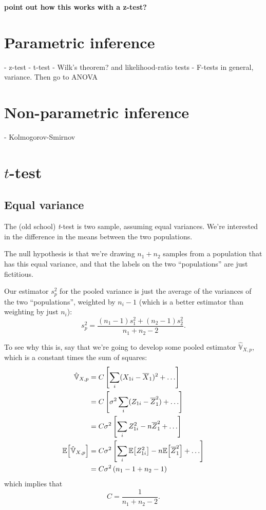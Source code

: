\textbf{point out how this works with a z-test?}

\section{Parametric inference}

- z-test
- t-test
- Wilk's theorem? and likelihood-ratio tests
- F-tests in general, variance. Then go to ANOVA

\section{Non-parametric inference}

- Kolmogorov-Smirnov

\section{$t$-test}

\subsection{Equal variance}\label{equal-variance}

The (old school) \emph{t}-test is two sample, assuming equal variances.
We're interested in the difference in the means between the two
populations.

The null hypothesis is that we're drawing \(n_1 + n_2\) samples from a
population that has this equal variance, and that the labels on the two
``populations'' are just fictitious.

Our estimator \(s_p^2\) for the pooled variance is just the average of
the variances of the two ``populations'', weighted by \(n_i - 1\) (which
is a better estimator than weighting by just \(n_i\)): \[
s_p^2 = \frac{(n_1 - 1) s_1^2 + (n_2 - 1) s_2^2}{n_1 + n_2 - 2}.
\]

To see why this is, say that we're going to develop some pooled estimator
$\hat{\mathbb{V}}_{X,p}$, which is a constant times the sum of squares:
\begin{align}
\hat{\mathbb{V}}_{X,p} &= C \left[ \sum_i (X_{1i} - \overline{X}_1)^2 + \ldots \right] \\
  &= C \left[ \sigma^2 \sum_i (Z_{1i} - \overline{Z}_1^2 ) + \ldots \right] \\
  &= C \sigma^2 \left[ \sum_i Z_{1i}^2 - n \overline{Z}_1^2 + \ldots \right] \\
\mathbb{E}\!\left[{\hat{\mathbb{V}}_{X,p}}\right] &= C \sigma^2 \left[ \sum_i \mathbb{E}\!\left[{Z_{1i}^2}\right] - n \mathbb{E}\!\left[{\overline{Z}_1^2}\right] + \ldots \right] \\
  &= C \sigma^2 \left( n_1 - 1 + n_2 - 1 \right) \\
\end{align}
which implies that
\begin{equation}
C = \frac{1}{n_1 + n_2 - 2}.
\end{equation}


